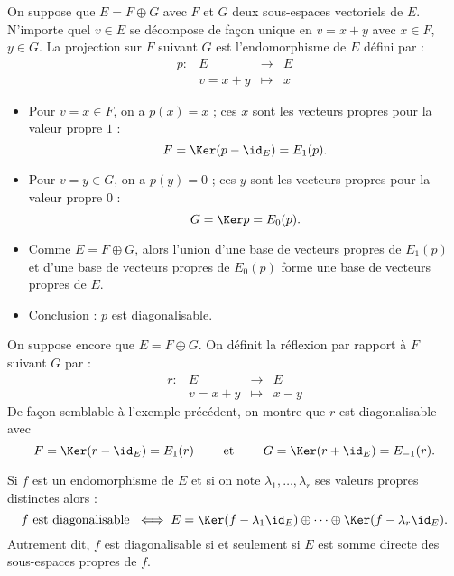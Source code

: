\documentclass[12pt, class=report,crop=false]{standalone}
\begin{document}
\begin{exemple}[Projection]
On suppose que $E = F \oplus G$ avec $F$ et $G$ deux sous-espaces vectoriels de $E$. N'importe quel $v \in E$ se décompose de façon unique en
 $v = x+y$ avec $x\in F$, $y\in G$.
La projection sur $F$ suivant $G$ est l'endomorphisme de $E$ défini par :
\[
\begin{array}{cccc}
p  : & E & \longrightarrow & E \\
&v = x + y & \longmapsto & x 
\end{array}
\]

\begin{itemize}
  \item 
Pour $v=x \in F$, on a $p(x)=x$ ; ces $x$ sont les vecteurs propres pour la valeur propre $1$ :
\[F = \Ker (p -\id_E) = E_1(p).\]

  \item 
Pour $v=y \in G$, on a $p(y) = 0$ ;  ces $y$ sont les vecteurs propres pour la valeur propre $0$ :
\[G = \Ker p = E_0(p).\]

  \item 
Comme $E = F \oplus G$, alors l'union d'une base de vecteurs propres de $E_1(p)$ et d'une base de vecteurs
propres de $E_0(p)$ forme une base de vecteurs propres de $E$. 

  \item Conclusion : $p$ est diagonalisable. 

\end{itemize}
\end{exemple}


\begin{exemple}[Réflexion]
On suppose encore que $E =F \oplus G$. On définit la réflexion par rapport à $F$ suivant $G$ par :
\[
\begin{array}{cccc}
r  : & E & \longrightarrow & E \\
& v = x + y & \longmapsto & x - y
\end{array}
\]
De façon semblable à l'exemple précédent, on montre que $r$ est diagonalisable avec 
\[F =\Ker (r-\id_E) = E_1(r) \qquad \text{ et } \qquad G = \Ker(r+\id_E) = E_{-1}(r) .\]

\end{exemple}



\begin{proposition}
Si $f$ est un endomorphisme de $E$ et si on note $\lambda_1,\ldots,\lambda_r$ ses valeurs propres distinctes 
alors :
\[f \text{ est diagonalisable } \iff E = \Ker (f -\lambda_1\id_E) \oplus \cdots \oplus \Ker (f -\lambda_r\id_E).\] 
Autrement dit, $f$ est diagonalisable si et seulement si $E$ est somme directe des sous-espaces propres de $f$.
\end{proposition}
\end{document}
